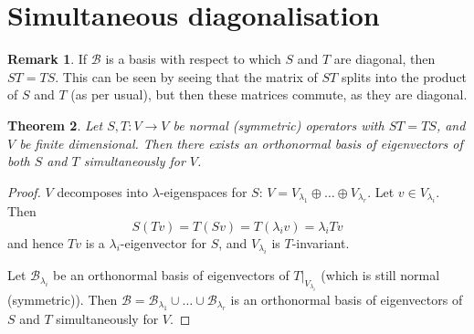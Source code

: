 \documentclass[10pt,fleqn]{article}
\newcommand{\basis}{\mathcal{B}}
\theoremstyle{definition} \newtheorem{defn}{Definition}[section]
\theoremstyle{plain}      \newtheorem{thm}[defn]{Theorem}
\theoremstyle{plain}      \newtheorem{prop}[defn]{Proposition}
\theoremstyle{plain}      \newtheorem{lem}[defn]{Lemma}
\theoremstyle{plain}      \newtheorem{cor}[defn]{Corollary}
\theoremstyle{plain}      \newtheorem{ad}[defn]{Addendum}
\theoremstyle{definition} \newtheorem{ex}[defn]{Example}
\theoremstyle{definition} \newtheorem{rem}[defn]{Remark}
\numberwithin{equation}{subsection}
\begin{document}
\section{Simultaneous diagonalisation}

\begin{rem}
    If $\basis$ is a basis with respect to which $S$ and $T$ are diagonal, then $ST=TS$.
    This can be seen by seeing that the matrix of $ST$ splits into the product of $S$ and $T$ (as per usual), but then these matrices commute, as they are diagonal.
\end{rem}

\begin{thm}
    Let $S,T:V\to V$ be normal (symmetric) operators with $ST=TS$, and $V$ be finite dimensional.
    Then there exists an orthonormal basis of eigenvectors of both $S$ and $T$ simultaneously for $V$.
\end{thm}

\begin{proof}
    $V$ decomposes into $\lambda$-eigenspaces for $S$: $V=V_{\lambda_1}\oplus\ldots\oplus V_{\lambda_r}$.
    Let $v\in V_{\lambda_i}$.
    Then
    \[
        S(Tv)=
        T(Sv)=
        T(\lambda_i v)=
        \lambda_i Tv
    \]
    and hence $Tv$ is a $\lambda_i$-eigenvector for $S$, and $V_{\lambda_i}$ is $T$-invariant.

    Let $\basis_{\lambda_i}$ be an orthonormal basis of eigenvectors of $T|_{V_{\lambda_i}}$ (which is still normal (symmetric)).
    Then $\basis=\basis_{\lambda_1}\cup\ldots\cup\basis_{\lambda_r}$ is an orthonormal basis of eigenvectors of $S$ and $T$ simultaneously for $V$.
\end{proof}

\appendix
\end{document}

